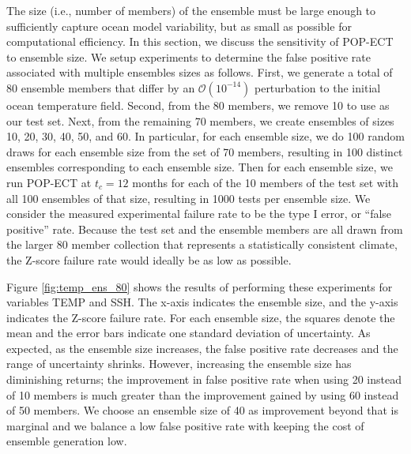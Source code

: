 \documentclass[gmd, manuscript]{copernicus}
\begin{document}
The size (i.e., number of members) of the ensemble must be large enough to sufficiently capture ocean model variability, but as small as possible for computational efficiency.  In this section, we discuss the sensitivity of POP-ECT to ensemble size.  We setup experiments to determine the false positive rate associated with multiple ensembles sizes as follows.
First, we generate a total of 80 ensemble members that differ by an $\mathcal{O}(10^{-14})$ perturbation to the initial ocean temperature field.  Second, from the 80 members, we remove 10 to use as our test set. Next, from the remaining 70 members, we create ensembles of sizes 10, 20, 30, 40, 50, and 60.  In particular, for each ensemble size, we do 100 random draws for each ensemble size from the set of 70 members, resulting in 100 distinct ensembles corresponding to each ensemble size. Then for each ensemble size, we run POP-ECT at $t_c = 12$ months for each of the 10 members of the test set with all 100 ensembles of that size, resulting in 1000 tests per ensemble size.   We consider the measured experimental failure rate to be the type I error, or ``false positive'' rate.  Because the test set and the ensemble members are all drawn from the larger 80 member collection that represents a statistically consistent climate, the Z-score failure rate would ideally be as low as possible. 

Figure \ref{fig:temp_ens_80} shows the results of performing these experiments for variables TEMP and SSH. The x-axis indicates the ensemble size, and the y-axis indicates the Z-score failure rate.  For each ensemble size, the squares denote the mean and the error bars indicate one standard deviation of uncertainty.  As expected,  as the ensemble size increases, the false positive rate decreases and the range of uncertainty shrinks.  However,  increasing the ensemble size has diminishing returns; the improvement in false positive rate when using 20 instead of 10 members is much greater than the improvement gained by using 60 instead of 50 members.  We choose an ensemble size of 40 as improvement beyond that is marginal and we balance a low false positive rate with keeping the cost of ensemble generation low.

 \label{sec:concl}
\end{document}
